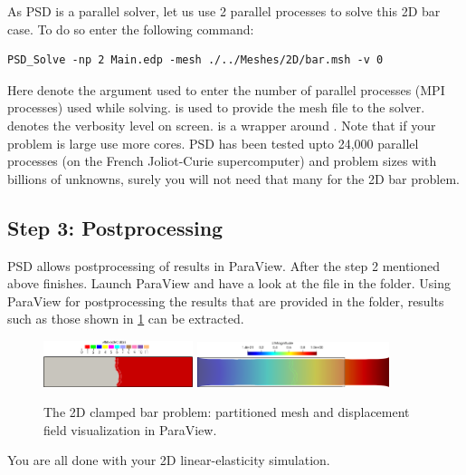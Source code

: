 As PSD is a parallel solver, let us use 2 parallel processes to solve
this 2D bar case. To do so enter the following command:

\begin{lstlisting}[style=BashInputStyle]
PSD_Solve -np 2 Main.edp -mesh ./../Meshes/2D/bar.msh -v 0
\end{lstlisting}

Here  denote the argument used to enter the number of
parallel processes (MPI processes) used while solving.
 is used to provide the mesh file to
the solver.  denotes the verbosity level on screen.
 is a wrapper around . Note that if
your problem is large use more cores. PSD has been tested upto 24,000
parallel processes (on the French Joliot-Curie supercomputer) and
problem sizes with billions of unknowns, surely you will not need that
many for the 2D bar problem.

\subsection{Step 3: Postprocessing}

PSD allows postprocessing of results in ParaView. After the step 2
mentioned above finishes. Launch ParaView and have a look at the
 file in the  folder. Using ParaView for
postprocessing the results that are provided in the 
folder, results such as those shown in \cref{bar-le-full-clampedd} can
be extracted.

\begin{figure}[h!]
\centering
\includegraphics[width=0.39\textwidth]{./Images/le-2d-bar-clamped-pulled-partioned}\hfill
\includegraphics[width=0.5\textwidth]{./Images/le-2d-bar-clamped-pulled.png}
\caption{The 2D clamped bar problem: partitioned mesh and displacement field visualization in ParaView. \label{bar-le-full-clampedd}}
\end{figure}

You are all done with your 2D linear-elasticity simulation.
